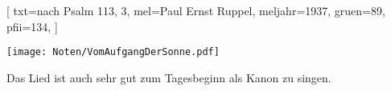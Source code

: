 [
    txt={nach Psalm 113, 3}, 
    mel={Paul Ernst Ruppel}, 
    meljahr={1937},
    gruen={89},
    pfii={134},
]

\texttt{[image: Noten/VomAufgangDerSonne.pdf]}

\endsong

\beginscripture{}
Das Lied ist auch sehr gut zum Tagesbeginn als Kanon zu singen.
\endscripture
